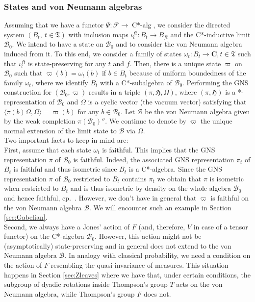 \documentclass[a4paper,12pt]{amsart}
\numberwithin{equation}{section}
\theoremstyle{definition}
\newcommand{\scrB}{\mathscr B}
\DeclareMathOperator{\Calg}{C*-alg}
\newcommand{\C}{\mathbf C}
\newcommand{\cF}{\mathcal F}
\newcommand{\fH}{\mathfrak H}
\newcommand{\fT}{\mathfrak T}
\begin{document}
\subsubsection{States and von Neumann algebras}\label{sec:state-prelim}
Assuming that we have a functor $\Psi:\cF\to \Calg$, we consider the directed system $(B_t,\ t\in\fT)$ with inclusion maps $\iota_t^{ft}:B_t\to B_{ft}$ and the C*-inductive limit $\mathscr B_0$.
We intend to have a state on $\mathscr B_0$ and to consider the von Neumann algebra induced from it.
To this end, we consider a family of states $\omega_t:B_t\to \C, t\in\fT$ such that $\iota_t^{ft}$ is state-preserving for any $t$ and $f$.
Then, there is a unique state $\varpi$ on $\mathscr B_{0}$ such that $\varpi(b) = \omega_t(b)$ if $b\in B_t$ because of uniform boundedness of the family $\omega_t$, where we identify $B_t$ with a C*-subalgebra of $\scrB_0$.
Performing the GNS construction for $(\mathscr B_0,\varpi)$ results in a triple $(\pi,\fH,\Omega)$, where $(\pi,\fH)$ is a *-representation of $\mathscr B_0$ and $\Omega$ is a cyclic vector (the vacuum vector) satisfying that $\langle \pi(b)\Omega , \Omega \rangle = \varpi(b)$ for any $b\in\mathscr B_0.$
Let $\mathscr B$ be the von Neumann algebra given by the weak completion $ \pi(\mathscr B_0)''$. 
We continue to denote by $\varpi$ the unique normal extension of the limit state to $\scrB$ via $\Omega$.\\[0.25cm]
Two important facts to keep in mind are:\\[0.1cm]
First, assume that each state $\omega_t$ is faithful.
This implies that the GNS representation $\pi$ of $\scrB_0$ is faithful.
Indeed, the associated GNS representation $\pi_t$ of $B_t$ is faithful and thus isometric since $B_t$ is a C*-algebra.
Since the GNS representation $\pi$ of $\scrB_0$ restricted to $B_t$ contains $\pi_t$ we obtain that $\pi$ is isometric when restricted to $B_t$ and is thus isometric by density on the whole algebra $\scrB_0$ and hence faithful, cp.~\cite[Proposition II.8.2.4]{Blackadar-06-Operator-Algebras}.
However, we don't have in general that $\varpi$ is faithful on the von Neumann algebra $\scrB.$
We will encounter such an example in Section \ref{sec:Gabelian}.\\[0.1cm]
Second, we always have a Jones' action of $F$ (and, therefore, $V$ in case of a tensor functor) on the C*-algebra $\mathscr B_0$.
However, this action might not be (asymptotically) state-preserving and in general does not extend to the von Neumann algebra $\scrB$. 
In analogy with classical probability, we need a condition on the action of $F$ resembling the quasi-invariance of measures.
This situation happens in Section \ref{sec:Zleaves} where we have that, under certain conditions, the subgroup of dyadic rotations inside Thompson's group $T$ acts on the von Neumann algebra, while Thompson's group $F$ does not.
\end{document}

